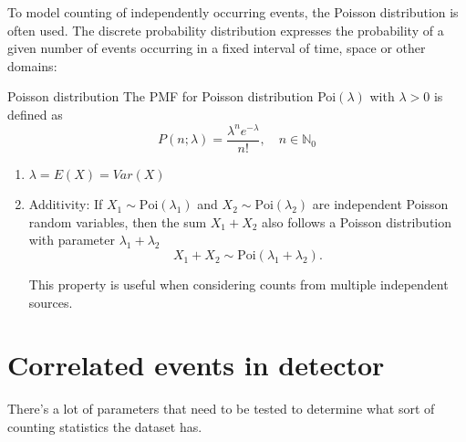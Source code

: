 To model counting of independently occurring events, the Poisson distribution is often used. The discrete probability distribution expresses the probability of a given number of events occurring in a fixed interval of time, space or other domains\cite{fellerIntroductionProbabilityTheory1968}:
\begin{note}
    {Poisson distribution}
    The \gls{PMF} for Poisson distribution Poi\((\lambda)\) with \(\lambda > 0\) is defined as
    \begin{equation}
        P(n;\lambda) = \frac{\lambda^n e^{-\lambda}}{n!}, \quad n \in \mathbb{N}_0
    \end{equation}
    \begin{enumerate}
        \item $\lambda = E(X) = Var(X)$ 
        \item Additivity: If $X_1 \sim \text{Poi}(\lambda_1)$ and $X_2 \sim \text{Poi}(\lambda_2)$ are independent Poisson random variables, then the sum $X_1 + X_2$ also follows a Poisson distribution with parameter $\lambda_1 + \lambda_2$
        \begin{equation}
            X_1 + X_2 \sim \text{Poi}(\lambda_1 + \lambda_2).
        \end{equation}
        
        This property is useful when considering counts from multiple independent sources.
    \end{enumerate}
\end{note}


\section{Correlated events in detector}



There's a lot of parameters that need to be tested to determine what sort of counting statistics the dataset has.

